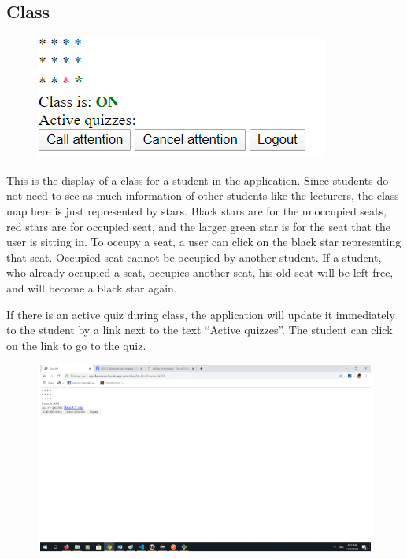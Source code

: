 \documentclass[a4paper, 11pt,openany]{book} %
\begin{document}
\subsection{Class}
\begin{figure}[H]
    \centering
    \includegraphics[width=\textwidth,height=\textheight,keepaspectratio]{images/24.png}
\end{figure}
This is the display of a class for a student in the application. Since students do not need to see as much information of other students like the lecturers, the class map here is just represented by stars. Black stars are for the unoccupied seats, red stars are for occupied seat, and the larger green star is for the seat that the user is sitting in. To occupy a seat, a user can click on the black star representing that seat. Occupied seat cannot be occupied by another student. If a student, who already occupied a seat, occupies another seat, his old seat will be left free, and will become a black star again. \par 
If there is an active quiz during class, the application will update it immediately to the student by a link next to the text “Active quizzes”. The student can click on the link to go to the quiz.
\begin{figure}[H]
    \centering
    \includegraphics[width=\textwidth,height=\textheight,keepaspectratio]{images/25.png}
\end{figure}
\end{document}
